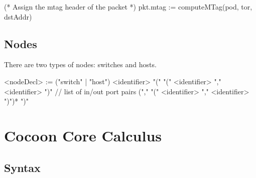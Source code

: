 \documentclass{report}
\begin{document}
\begin{ccnlisting}{}
(* Assign the mtag header of the packet *)
pkt.mtag := computeMTag(pod, tor, dstAddr)
\end{ccnlisting}

\section{Nodes}

There are two types of nodes: switches and hosts.  

\begin{bnflisting}{}
<nodeDecl> := ("switch" | "host") <identifier> "(" 
              "(" <identifier> "," <identifier> ")" // list of in/out port pairs
              ("," "(" <identifier> "," <identifier> ")")*
              ")"
\end{bnflisting}

\clearpage
\appendix

\chapter{Cocoon Core Calculus}

\section{Syntax}
\end{document}
